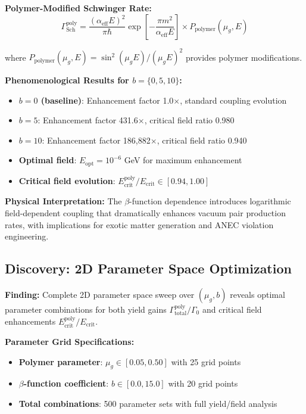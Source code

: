 \documentclass[11pt]{article}
\begin{document}
\textbf{Polymer-Modified Schwinger Rate:}
\begin{equation}
\Gamma_{\text{Sch}}^{\text{poly}} = \frac{(\alpha_{\text{eff}} E)^2}{\pi \hbar} \exp\left[-\frac{\pi m^2}{\alpha_{\text{eff}} E}\right] \times P_{\text{polymer}}(\mu_g, E)
\end{equation}

where $P_{\text{polymer}}(\mu_g, E) = \sin^2(\mu_g E)/(\mu_g E)^2$ provides polymer modifications.

\textbf{Phenomenological Results for $b = \{0, 5, 10\}$:}
\begin{itemize}
    \item \textbf{$b = 0$ (baseline)}: Enhancement factor 1.0$\times$, standard coupling evolution
    \item \textbf{$b = 5$}: Enhancement factor 431.6$\times$, critical field ratio 0.980
    \item \textbf{$b = 10$}: Enhancement factor 186,882$\times$, critical field ratio 0.940
    \item \textbf{Optimal field}: $E_{\text{opt}} = 10^{-6}$ GeV for maximum enhancement
    \item \textbf{Critical field evolution}: $E_{\text{crit}}^{\text{poly}}/E_{\text{crit}} \in [0.94, 1.00]$
\end{itemize}

\textbf{Physical Interpretation:} The $\beta$-function dependence introduces logarithmic field-dependent coupling that dramatically enhances vacuum pair production rates, with implications for exotic matter generation and ANEC violation engineering.

\subsection{Discovery: 2D Parameter Space Optimization}

\textbf{Finding:} Complete 2D parameter space sweep over $(\mu_g, b)$ reveals optimal parameter combinations for both yield gains $\Gamma_{\text{total}}^{\text{poly}}/\Gamma_0$ and critical field enhancements $E_{\text{crit}}^{\text{poly}}/E_{\text{crit}}$.

\textbf{Parameter Grid Specifications:}
\begin{itemize}
    \item \textbf{Polymer parameter}: $\mu_g \in [0.05, 0.50]$ with 25 grid points
    \item \textbf{$\beta$-function coefficient}: $b \in [0.0, 15.0]$ with 20 grid points
    \item \textbf{Total combinations}: 500 parameter sets with full yield/field analysis
\end{itemize}
\end{document}
